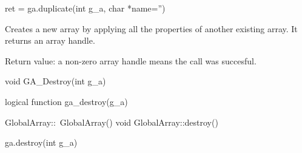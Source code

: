 \documentclass[10pt]{article}
\begin{document}
\begin{pyapi}
\begin{pycode}
ret = ga.duplicate(int g_a, char *name='')
\end{pycode}
\begin{funcargs}
\end{funcargs}
\end{pyapi}

\gcoll

\begin{desc}

Creates a new array by applying all the properties of another existing array.
It returns an array handle.

Return value: a non-zero array handle means the call was succesful.

\end{desc}


\begin{capi}
\begin{ccode}
void GA_Destroy(int g_a)
\end{ccode}
\begin{funcargs}
\end{funcargs}
\end{capi}

\begin{fapi}
\begin{fcode}
logical function ga_destroy(g_a)
\end{fcode}
\begin{funcargs}
\end{funcargs}
\end{fapi}

\begin{cxxapi}
\begin{cxxcode}
GlobalArray::~GlobalArray()
void GlobalArray::destroy()
\end{cxxcode}
\end{cxxapi}

\begin{pyapi}
\begin{pycode}
ga.destroy(int g_a)
\end{pycode}
\begin{funcargs}
\end{funcargs}
\end{pyapi}
\end{document}
